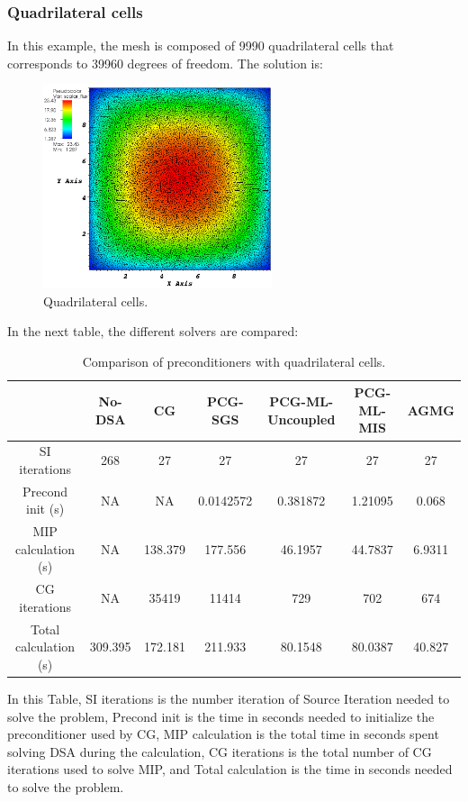 \subsubsection{Quadrilateral cells}
In this example, the mesh is composed of 9990 quadrilateral cells that corresponds 
to 39960 degrees of freedom. The solution is:
\begin{figure}[H]
\centering
\includegraphics[width=0.6\textwidth]{homog_quad_crop}
\caption{Quadrilateral cells.}
\end{figure}
In the next table, the different solvers are compared:
\begin{table}[H]
\begin{center}
\begin{tabular}{|c|c|c|c|c|c|c|}
\hline
 & No-DSA & CG & PCG-SGS & PCG-ML-Uncoupled & PCG-ML-MIS & AGMG\\
\hline
SI iterations & 268 & 27 & 27 & 27 & 27 & 27 \\
Precond init (s) & NA & NA & 0.0142572 & 0.381872 & 1.21095 & 0.068\\
MIP calculation (s) & NA & 138.379 & 177.556 & 46.1957 & 44.7837 & 6.9311\\
CG iterations & NA & 35419 & 11414 & 729 & 702 & 674\\
Total calculation (s) & 309.395 & 172.181 & 211.933 & 80.1548 & 80.0387 &
40.827\\
\hline
\end{tabular}
\caption{Comparison of preconditioners with quadrilateral cells.}
\end{center}
\end{table}
In this Table, SI iterations is the number iteration of Source Iteration
needed to solve the problem, Precond init is the time in seconds needed to
initialize the preconditioner used by CG, MIP calculation is the total time in
seconds spent solving DSA during the calculation, CG iterations is the total number 
of CG iterations used to solve MIP, and Total calculation is the time in
seconds needed to solve the problem.

